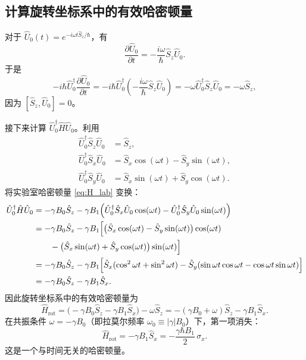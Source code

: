 \documentclass[12pt,a4paper]{article}
\begin{document}
	\subsection{计算旋转坐标系中的有效哈密顿量}
	
	对于 $\hat{U}_0(t)=e^{-i\omega t \hat{S}_z/\hbar}$，有
	\begin{equation}
		\frac{\partial \hat{U}_0}{\partial t} = -\frac{i\omega}{\hbar} \hat{S}_z \hat{U}_0.
	\end{equation}
	于是
	\begin{equation}
		-i\hbar \hat{U}_0^\dagger \frac{\partial \hat{U}_0}{\partial t} = -i\hbar \hat{U}_0^\dagger \left(-\frac{i\omega}{\hbar} \hat{S}_z \hat{U}_0\right) = -\omega \hat{U}_0^\dagger \hat{S}_z \hat{U}_0 = -\omega \hat{S}_z,
	\end{equation}
	因为 $[\hat{S}_z, \hat{U}_0]=0$。
	
	接下来计算 $\hat{U}_0^\dagger \hat{H} \hat{U}_0$。利用
	\begin{align}
		\hat{U}_0^\dagger \hat{S}_z \hat{U}_0 &= \hat{S}_z,\\
		\hat{U}_0^\dagger \hat{S}_x \hat{U}_0 &= \hat{S}_x \cos(\omega t) - \hat{S}_y \sin(\omega t),\\
		\hat{U}_0^\dagger \hat{S}_y \hat{U}_0 &= \hat{S}_x \sin(\omega t) + \hat{S}_y \cos(\omega t).
	\end{align}
	将实验室哈密顿量 \eqref{eq:H_lab} 变换：
	\begin{align}
		\hat{U}_0^\dagger \hat{H} \hat{U}_0 &= -\gamma B_0 \hat{S}_z - \gamma B_1 \Bigl( \hat{U}_0^\dagger \hat{S}_x \hat{U}_0 \cos(\omega t) - \hat{U}_0^\dagger \hat{S}_y \hat{U}_0 \sin(\omega t) \Bigr) \notag\\
		&= -\gamma B_0 \hat{S}_z - \gamma B_1 \Bigl[ \bigl(\hat{S}_x \cos(\omega t) - \hat{S}_y \sin(\omega t)\bigr)\cos(\omega t) \notag\\
		&\qquad - \bigl(\hat{S}_x \sin(\omega t) + \hat{S}_y \cos(\omega t)\bigr)\sin(\omega t) \Bigr] \notag\\
		&= -\gamma B_0 \hat{S}_z - \gamma B_1 \Bigl[ \hat{S}_x (\cos^2\omega t + \sin^2\omega t) - \hat{S}_y (\sin\omega t\cos\omega t - \cos\omega t\sin\omega t) \Bigr] \notag\\
		&= -\gamma B_0 \hat{S}_z - \gamma B_1 \hat{S}_x.
	\end{align}
	因此旋转坐标系中的有效哈密顿量为
	\begin{equation}
		\hat{H}_{\text{rot}} = \bigl(-\gamma B_0 \hat{S}_z - \gamma B_1 \hat{S}_x\bigr) - \omega \hat{S}_z = -(\gamma B_0 + \omega)\hat{S}_z - \gamma B_1 \hat{S}_x.
	\end{equation}
	在共振条件 $\omega = -\gamma B_0$（即拉莫尔频率 $\omega_0 \equiv |\gamma| B_0$）下，第一项消失：
	\begin{equation}
		\boxed{\hat{H}_{\text{rot}} = -\gamma B_1 \hat{S}_x = -\frac{\gamma\hbar B_1}{2}\,\sigma_x}. \label{eq:Hrot_res}
	\end{equation}
	这是一个与时间无关的哈密顿量。
	
\end{document}
